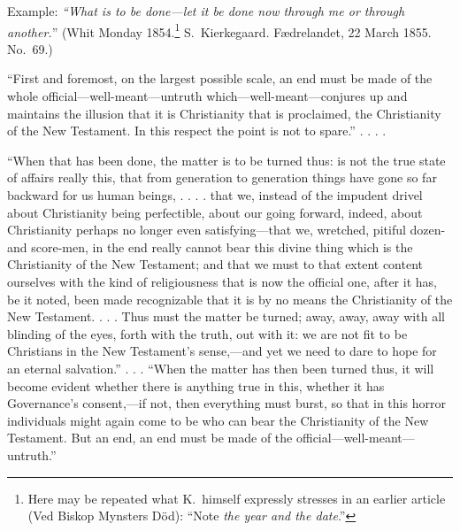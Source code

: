 \documentclass[12pt,a4paper]{article}
\newcommand{\opage}[1]{\marginnote{\footnotesize\textit{[#1]}}}
\begin{document}
Example: \emph{``What is to be done---let it be done
now through me or through another.}'' (Whit Monday
1854.\footnote{Here may be repeated what K.\ himself expressly stresses in an
earlier article (Ved Biskop Mynsters Död): ``Note
\emph{the year and the date}.''} S.\ Kierkegaard. Fædrelandet, 22 March 1855.
No.\ 69.)

``First and foremost, on the largest possible
scale, an end must be made of the whole official---well-meant---untruth
which---well-meant---conjures up and
maintains the illusion that it is Christianity that is proclaimed,
the Christianity of the New Testament. In this respect
the point is not to spare.'' . . . .

``When that has been done, the matter is to be turned thus:
is not the true state of affairs really this, that
from generation to generation things have gone so far backward for
us human beings, . . . . that we, instead of the impudent
drivel about Christianity being perfectible, about our
going forward, indeed, about Christianity perhaps no longer
even satisfying---that we, wretched, pitiful dozen- and
score-men, in the end really
\opage{26}cannot bear this divine thing which is the Christianity of the New
Testament; and that we must to that extent content ourselves
with the kind of religiousness that is now the official one, after
it has, be it noted, been made recognizable that it is by no means
the Christianity of the New Testament. . . . Thus must
the matter be turned; away, away, away with all blinding of the eyes,
forth with the truth, out with it: we are not fit
to be Christians in the New Testament's sense,---and
yet we need to dare to hope for an eternal salvation.'' . . .
``When the matter has then been turned thus, it will become evident
whether there is anything true in this, whether it has Governance's
consent,---if not, then everything must burst, so that in
this horror individuals might again come to be who can
bear the Christianity of the New Testament. But an end,
an end must be made of the official---well-meant---untruth.''
\end{document}
